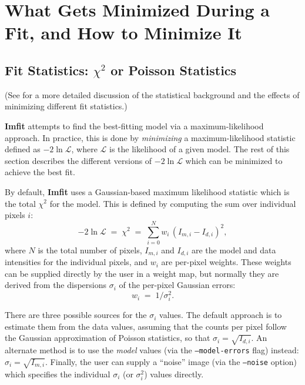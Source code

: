 \documentclass[10pt,a4paper,article]{memoir}
\newcommand{\Imfit}{\textbf{Imfit}}
\newcommand{\chisquare}{\ensuremath{\chi^{2}}}
\begin{document}
\newpage

\chapter{What Gets Minimized During a Fit, and How to Minimize It}

\section{Fit Statistics: \chisquare{} or Poisson Statistics}\label{sec:fit-statistics}

(See \cite{erwin15} for a more detailed discussion of the statistical
background and the effects of minimizing different fit statistics.)

\Imfit{} attempts to find the best-fitting model via a
maximum-likelihood approach. In practice, this is done by
\textit{minimizing} a maximum-likelihood statistic defined as $-2 \ln
\mathcal{L}$, where $\mathcal{L}$ is the likelihood of a given model. The rest
of this section describes the different versions of $-2 \ln \mathcal{L}$
which can be minimized to achieve the best fit.

By default, \Imfit{} uses a Gaussian-based maximum likelihood statistic
which is the total \chisquare{} for the model. This is defined by
computing the sum over individual pixels $i$:
\begin{equation}
-2 \ln \mathcal{L}  \; = \; \chisquare \; = \; \sum_{i = 0}^{N} w_{i} \, (I_{m, i} - I_{d, i})^2 ,
\end{equation}
where $N$ is the total number of pixels, $I_{m, i}$ and $I_{d, i}$ are the model and data intensities
for the individual pixels, and $w_{i}$ are per-pixel weights. These weights can be
supplied directly by the user in a weight map, but normally they are derived from the
dispersions $\sigma_{i}$ of the per-pixel Gaussian errors:
\begin{equation}
w_{i} \; = \; 1/\sigma_{i}^{2} .
\end{equation}

There are three possible sources for the $\sigma_{i}$ values. The
default approach is to estimate them from the data values, assuming that
the counts per pixel follow the Gaussian approximation of Poisson
statistics, so that $\sigma_{i} = \sqrt{I_{d,i}}$. An alternate method
is to use the \textit{model} values (via the \texttt{--model-errors}
flag) instead: $\sigma_{i} = \sqrt{I_{m,i}}$. Finally, the user can
supply a ``noise'' image (via the \texttt{--noise} option) which
specifies the individual $\sigma_{i}$ (or $\sigma_{i}^{2}$) values
directly.
\end{document}

